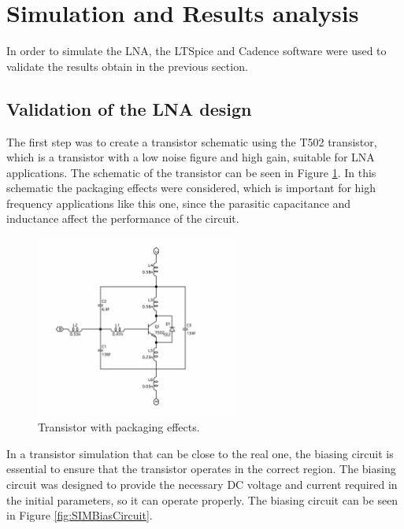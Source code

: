 \section{Simulation and Results analysis}

In order to simulate the LNA, the LTSpice and Cadence software were used to validate the results obtain in the previous section. 

\subsection{Validation of the LNA design}

The first step was to create a transistor schematic using the T502 transistor, which is a transistor with a low noise figure and high gain, suitable for LNA applications. The schematic of the transistor can be seen in Figure \ref{fig:TransistorReal}. In this schematic the packaging effects were considered, which is important for high frequency applications like this one, since the parasitic capacitance and inductance affect the performance of the circuit.

\begin{figure}[H]
    \centering
    \includegraphics[width=0.6\textwidth]{Images/TransistorReal.png}
    \caption{Transistor with packaging effects.}
    \label{fig:TransistorReal}
\end{figure}

In a transistor simulation that can be close to the real one, the biasing circuit is essential to ensure that the transistor operates in the correct region. The biasing circuit was designed to provide the necessary DC voltage and current required in the initial parameters, so it can operate properly. The biasing circuit can be seen in Figure \ref{fig:SIMBiasCircuit}.

